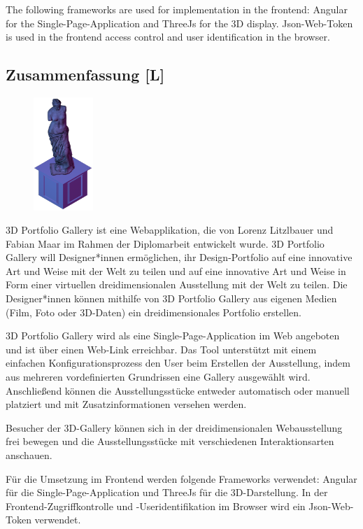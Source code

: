 The following frameworks are used for implementation in the frontend: Angular for the Single-Page-Application and ThreeJs for the 3D display. Json-Web-Token is used in the frontend access control and user identification in the browser.
\newpage
\begin{spacing}{1}
    \chapter*{Zusammenfassung [L]}
\end{spacing}
\begin{figure}
    \begin{center}
      \includegraphics[width=0.2\textwidth]{pics/statue.png}
    \end{center}
\end{figure}
3D Portfolio Gallery ist eine Webapplikation, die von Lorenz Litzlbauer und Fabian Maar im Rahmen der Diplomarbeit entwickelt wurde. 3D Portfolio Gallery will Designer*innen ermöglichen, ihr Design-Portfolio auf eine innovative Art und Weise mit der Welt zu teilen und auf eine innovative Art und Weise in Form einer virtuellen dreidimensionalen Ausstellung mit der Welt zu teilen. Die Designer*innen können mithilfe von 3D Portfolio Gallery aus eigenen Medien (Film, Foto oder 3D-Daten) ein dreidimensionales Portfolio erstellen.

3D Portfolio Gallery wird als eine Single-Page-Application im Web angeboten und ist über einen Web-Link erreichbar. Das Tool unterstützt mit einem einfachen Konfigurationsprozess den User beim Erstellen der Ausstellung, indem aus mehreren vordefinierten Grundrissen eine Gallery ausgewählt wird. Anschließend können die Ausstellungsstücke entweder automatisch oder manuell platziert und mit Zusatzinformationen versehen werden.

Besucher der 3D-Gallery können sich in der dreidimensionalen Webausstellung frei bewegen und die Ausstellungsstücke mit verschiedenen Interaktionsarten anschauen.

Für die Umsetzung im Frontend werden folgende Frameworks verwendet: Angular für die Single-Page-Application und ThreeJs für die 3D-Darstellung. In der Frontend-Zugriffkontrolle und -Useridentifikation im Browser wird ein Json-Web-Token verwendet.